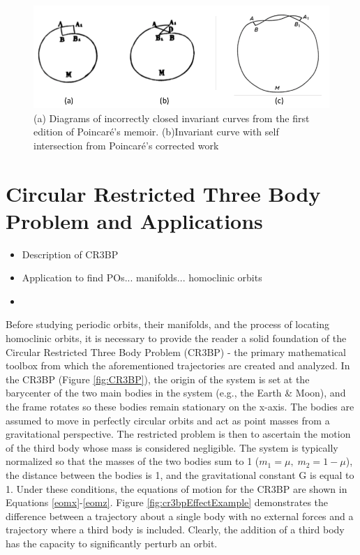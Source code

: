 \documentclass[11pt]{article} %
\begin{document}
\begin{figure}[H]
\centering
\includegraphics[width=5in]{curveIntersection1.png}\nonumber{}
\caption{(a) Diagrams of incorrectly closed invariant curves from the first edition of Poincaré's memoir. (b)Invariant curve with self intersection from Poincaré's corrected work \cite{BarrowGreen1997}}
\label{fig:curveIntersection1}
\end{figure}


\section*{Circular Restricted Three Body Problem and Applications}
\begin{itemize}
	\item \color{red}Description of CR3BP
	\item Application to find POs... manifolds... homoclinic orbits
	\item \color{black}
\end{itemize}
Before studying periodic orbits, their manifolds, and the process of locating homoclinic orbits, it is necessary to provide the reader a solid foundation of the Circular Restricted Three Body Problem (CR3BP) - the primary mathematical toolbox from which the aforementioned trajectories are created and analyzed. In the CR3BP (Figure \ref{fig:CR3BP}), the origin of the system is set at the barycenter of the two main bodies in the system (e.g., the Earth \& Moon), and the frame rotates so these bodies remain stationary on the x-axis. The bodies are assumed to move in perfectly circular orbits and act as point masses from a gravitational perspective. The restricted problem is then to ascertain the motion of the third body whose mass is considered negligible. The system is typically normalized so that the masses of the two bodies sum to 1 ($m_1 = \mu,\; m_2 = 1-\mu$), the distance between the bodies is 1, and the gravitational constant G is equal to 1. Under these conditions, the equations of motion for the CR3BP are shown in Equations \ref{eomx}-\ref{eomz}. Figure \ref{fig:cr3bpEffectExample} demonstrates the difference between a trajectory about a single body with no external forces and a trajectory where a third body is included. Clearly, the addition of a third body has the capacity to significantly perturb an orbit. 
\end{document}
